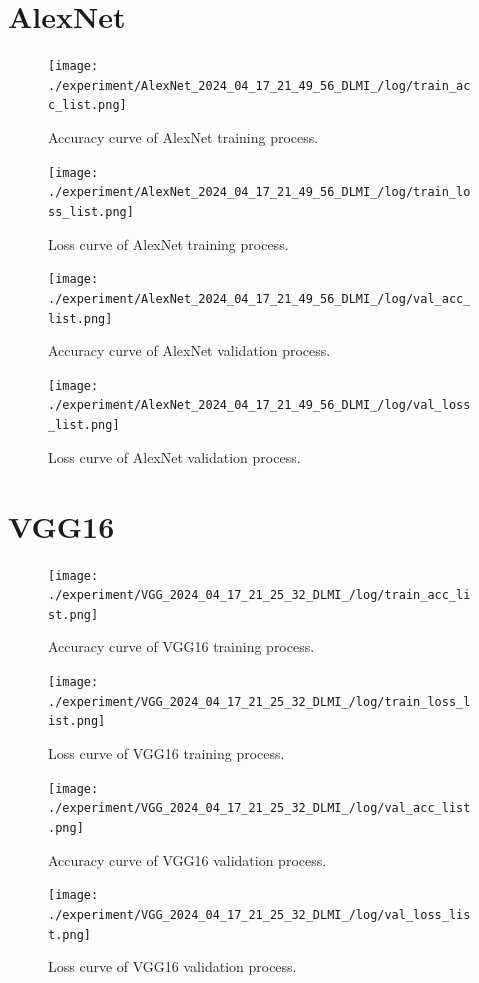 \documentclass[final,5p,times,twocolumn,sort&compress]{elsarticle}
\begin{document}
\begin{appendices}
    \section{AlexNet}
    \begin{figure}[H]
        \centering
        \texttt{[image: ./experiment/AlexNet\_2024\_04\_17\_21\_49\_56\_DLMI\_/log/train\_acc\_list.png]}
        \caption{Accuracy curve of AlexNet training process.}
    \end{figure}
    \begin{figure}[H]
        \centering
        \texttt{[image: ./experiment/AlexNet\_2024\_04\_17\_21\_49\_56\_DLMI\_/log/train\_loss\_list.png]}
        \caption{Loss curve of AlexNet training process.}
    \end{figure}
    \begin{figure}[H]
        \centering
        \texttt{[image: ./experiment/AlexNet\_2024\_04\_17\_21\_49\_56\_DLMI\_/log/val\_acc\_list.png]}
        \caption{Accuracy curve of AlexNet validation process.}
    \end{figure}
    \begin{figure}[H]
        \centering
        \texttt{[image: ./experiment/AlexNet\_2024\_04\_17\_21\_49\_56\_DLMI\_/log/val\_loss\_list.png]}
        \caption{Loss curve of AlexNet validation process.}
    \end{figure}

    \section{VGG16}
    \begin{figure}[H]
        \centering
        \texttt{[image: ./experiment/VGG\_2024\_04\_17\_21\_25\_32\_DLMI\_/log/train\_acc\_list.png]}
        \caption{Accuracy curve of VGG16 training process.}
    \end{figure}
    \begin{figure}[H]
        \centering
        \texttt{[image: ./experiment/VGG\_2024\_04\_17\_21\_25\_32\_DLMI\_/log/train\_loss\_list.png]}
        \caption{Loss curve of VGG16 training process.}
    \end{figure}
    \begin{figure}[H]
        \centering
        \texttt{[image: ./experiment/VGG\_2024\_04\_17\_21\_25\_32\_DLMI\_/log/val\_acc\_list.png]}
        \caption{Accuracy curve of VGG16 validation process.}
    \end{figure}
    \begin{figure}[H]
        \centering
        \texttt{[image: ./experiment/VGG\_2024\_04\_17\_21\_25\_32\_DLMI\_/log/val\_loss\_list.png]}
        \caption{Loss curve of VGG16 validation process.}
    \end{figure}


\end{appendices}
\end{document}
